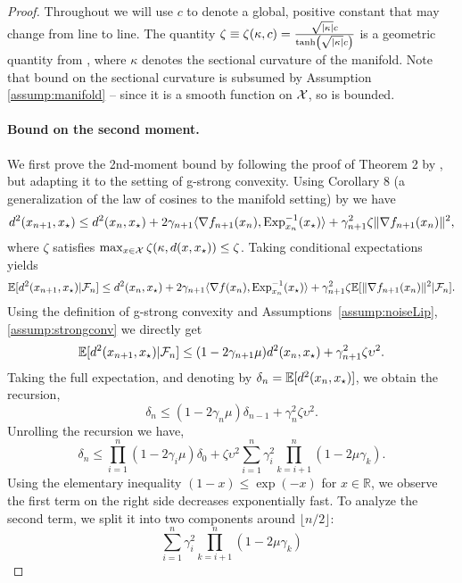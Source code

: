 \begin{proof}
Throughout we will use $c$ to denote a global, positive constant that may change from line to line. The quantity $\zeta \equiv \zeta(\kappa, c) = \frac{\sqrt{\abs{\kappa}} c}{\tanh(\sqrt{\abs{\kappa}} c)}$ is a geometric quantity from \citet{zhang2016first}, where $\kappa$ denotes the sectional curvature of the manifold.  Note that bound on the sectional curvature is subsumed by Assumption \ref{assump:manifold} -- since it is a smooth function on $\mathcal{X}$, so is bounded.

\paragraph{Bound on the second moment.}
We first prove the 2nd-moment bound by following the proof of Theorem 2 by \citet{moulines2011non}, but adapting it to the setting of g-strong convexity.
Using Corollary 8 (a generalization of the law of cosines to the manifold setting) by \citet{zhang2016first} we have
\begin{equation}\label{eq:mom2}
d^2(x_{n+1},x_\star) \leq d^2(x_{n},x_\star) +2\gamma_{n+1}\langle \nabla f_{n+1}(x_n),\Exp_{x_n}^{-1}(x_\star)\rangle +\gamma_{n+1}^2 \zeta \Vert  \nabla f_{n+1}(x_n) \Vert^2,
\end{equation}
where $\zeta$ satisfies $\max_{x\in\mathcal{X}} \zeta(\kappa, d(x,x_\star))\leq \zeta$.
Taking conditional expectations yields
\[
\E[d^2(x_{n+1},x_\star)\vert \F_n]\leq d^2(x_{n},x_\star) +2\gamma_{n+1}\langle \nabla f(x_n),\Exp_{x_n}^{-1}(x_\star)\rangle +\gamma_{n+1}^2 \zeta  \E[\Vert  \nabla f_{n+1}(x_n) \Vert^2\vert \F_n].
\]
Using the definition of g-strong convexity and Assumptions~\ref{assump:noiseLip},\ref{assump:strongconv} we directly get
 \[
\mathbb{E}[d^2(x_{n+1},x_\star) | \mathcal{F}_n]\leq (1-2\gamma_{n+1}\mu )d^2(x_{n},x_\star)+ \gamma_{n+1}^2 \zeta \upsilon^2.
\]
Taking the full expectation, and denoting by $\delta_{n}=\mathbb{E}[d^2(x_{n},x_\star)]$, we obtain the recursion,
\[
\delta_n\leq (1-2\gamma_{n}\mu )\delta_{n-1}+ \gamma_{n}^2 \zeta \upsilon^2.
\]
Unrolling the recursion we have,
\[
\delta_n\leq \prod_{i=1}^n(1-2\gamma_{i}\mu )\delta_0 + \zeta\upsilon^2 \sum_{i=1}^n \gamma_i^2 \prod_{k=i+1}^n(1-2\mu\gamma_k).
\]
Using the elementary inequality $(1-x)\leq \exp(-x)$ for $x\in\mathbb R$, we observe the first term on the right side decreases exponentially fast. To analyze the second term, we split it into two components around $\lfloor n/2 \rfloor$:
\begin{equation}
\sum_{i=1}^n \gamma_i^2 \prod_{k=i+1}^n(1-2\mu\gamma_k)

\end{equation}
\end{proof}
